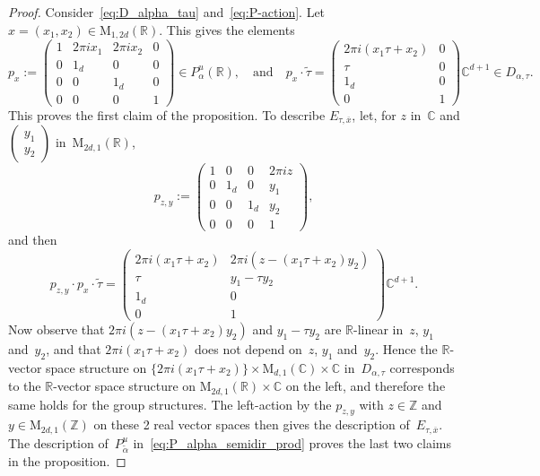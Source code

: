 \documentclass[11pt]{article}
\providecommand{\C}{}
\theoremstyle{plain}
\theoremstyle{definition}
\numberwithin{equation}{subsection}
\let\ol\overline
\renewcommand{\C}{\mathbb C}
\newcommand{\R}{\mathbb R}
\newcommand{\Z}{\mathbb Z}
\newcommand{\rmM}{\mathrm{M}}
\begin{document}
\begin{proof}
Consider~\eqref{eq:D_alpha_tau} and~\eqref{eq:P-action}.
Let $x=(x_1,x_2)\in\rmM_{1,2d}(\R)$. This gives the elements
\[
p_x :=
\begin{pmatrix}
1 & 2\pi ix_1 & 2\pi ix_2 & 0\\
0 & 1_d & 0 & 0\\
0 & 0 & 1_d & 0\\
0 & 0 & 0 & 1
\end{pmatrix}
\in P^u_\alpha(\R),
\quad
\text{and}
\quad
p_x{\cdot}\tilde{\tau} =
\begin{pmatrix}
2\pi i(x_1\tau + x_2)& 0\\
\tau & 0\\ 1_d & 0\\ 0 & 1
\end{pmatrix}
\C^{d+1}\in D_{\alpha,\tau}.
\]
This proves the first claim of the proposition. To describe
$E_{\tau,\ol{x}}$, let, for $z$ in~$\C$ and
$(\begin{smallmatrix}y_1\\y_2\end{smallmatrix})$ in~$\rmM_{2d,1}(\R)$,
\[
p_{z,y} :=
\begin{pmatrix}
1 & 0 & 0 & 2\pi i z\\
0 & 1_d & 0 & y_1\\
0 & 0 & 1_d & y_2\\
0 & 0 & 0 & 1
\end{pmatrix},
\]
and then
\[
p_{z,y}{\cdot}p_x{\cdot}\tilde{\tau} =
\begin{pmatrix}
2\pi i(x_1\tau + x_2)& 2\pi i(z-(x_1\tau+x_2)y_2)\\
\tau & y_1-\tau y_2\\ 1_d & 0\\ 0 & 1
\end{pmatrix}
\C^{d+1}.
\]
Now observe that $2\pi i(z-(x_1\tau+x_2)y_2)$ and $y_1-\tau y_2$ are
$\R$-linear in~$z$, $y_1$ and~$y_2$, and that $2\pi i(x_1\tau + x_2)$
does not depend on~$z$, $y_1$ and~$y_2$. Hence the $\R$-vector space
structure on $\{2\pi i(x_1\tau + x_2)\}\times\rmM_{d,1}(\C)\times \C$
in~$D_{\alpha,\tau}$ corresponds to the $\R$-vector space structure on
$\rmM_{2d,1}(\R)\times\C$ on the left, and therefore the same holds
for the group structures. The left-action by the $p_{z,y}$ with
$z\in\Z$ and $y\in\rmM_{2d,1}(\Z)$ on these 2 real vector spaces then
gives the description of~$E_{\tau,\ol{x}}$. The description
of~$P^u_{\tilde{\alpha}}$ in~\eqref{eq:P_alpha_semidir_prod} proves
the last two claims in the proposition.
\end{proof}
\end{document}

